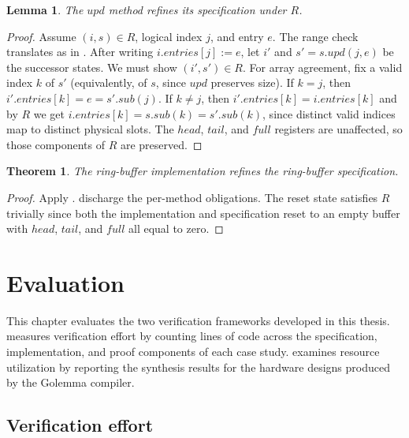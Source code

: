 \documentclass[fontset=fira-newtxsf]{mitthesis}
\theoremstyle{definition}
\theoremstyle{plain}
\newtheorem{lemma}{Lemma}[section]
\newtheorem{theorem}{Theorem}[section]
\begin{document}
\begin{lemma} \label{lem:rb-upd}
The $\mathit{upd}$ method refines its specification under $R$.
\end{lemma}

\begin{proof}[Proof]
Assume $(i, s) \in R$, logical index $j$, and entry $e$.
The range check translates as in .
After writing $i.\mathit{entries}[j] := e$, let $i'$ and $s' = s.\mathit{upd}(j, e)$ be the successor states.
We must show $(i', s') \in R$.
For array agreement, fix a valid index $k$ of $s'$ (equivalently, of $s$, since $\mathit{upd}$ preserves size).
If $k = j$, then $i'.\mathit{entries}[k] = e = s'.\mathit{sub}(j)$.
If $k \neq j$, then $i'.\mathit{entries}[k] = i.\mathit{entries}[k]$ and by $R$ we get $i.\mathit{entries}[k] = s.\mathit{sub}(k) = s'.\mathit{sub}(k)$, since distinct valid indices map to distinct physical slots.
The $\mathit{head}$, $\mathit{tail}$, and $\mathit{full}$ registers are unaffected, so those components of $R$ are preserved.
\end{proof}

\begin{theorem} \label{thm:rb-correct}
The ring-buffer implementation refines the ring-buffer specification.
\end{theorem}

\begin{proof}[Proof]
Apply .
 discharge the per-method obligations.
The reset state satisfies $R$ trivially since both the implementation and specification reset to an empty buffer with $\mathit{head}$, $\mathit{tail}$, and $\mathit{full}$ all equal to zero.
\end{proof}

\chapter{Evaluation} \label{chap:evaluation}
This chapter evaluates the two verification frameworks developed in this thesis.
 measures verification effort by counting lines of code across the specification, implementation, and proof components of each case study.
 examines resource utilization by reporting the synthesis results for the hardware designs produced by the Golemma compiler.
\section{Verification effort} \label{sec:eval-verif}
\end{document}
